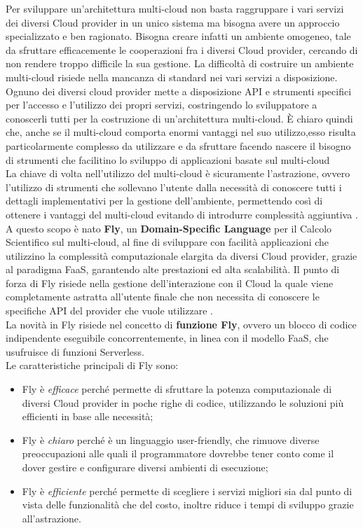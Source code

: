 Per sviluppare un'architettura multi-cloud non basta raggruppare i vari servizi dei diversi Cloud provider in un unico sistema ma bisogna avere un approccio specializzato e ben ragionato. 
Bisogna creare infatti un ambiente omogeneo, tale da sfruttare efficacemente le cooperazioni fra i diversi Cloud provider, cercando di non rendere troppo difficile la sua gestione.
La difficoltà di costruire un ambiente multi-cloud risiede nella mancanza di standard nei vari servizi a disposizione. Ognuno dei diversi cloud provider mette a disposizione API e strumenti specifici per l'accesso e l'utilizzo dei propri servizi, costringendo lo sviluppatore a conoscerli tutti per la costruzione di un'architettura multi-cloud.
È chiaro quindi che, anche se il multi-cloud comporta enormi vantaggi nel suo utilizzo,esso risulta particolarmente complesso da utilizzare e da sfruttare facendo nascere il bisogno di strumenti che facilitino lo sviluppo di applicazioni basate sul multi-cloud\\
La chiave di volta nell’utilizzo del multi-cloud è sicuramente l’astrazione, 
ovvero l'utilizzo di strumenti che sollevano l'utente dalla necessità di conoscere tutti i dettagli implementativi per la gestione dell'ambiente, 
permettendo così di ottenere i vantaggi del multi-cloud evitando di introdurre complessità aggiuntiva \cite{ForbesMultiCloud}. 
A questo scopo è nato \textbf{Fly}, un \textbf{Domain-Specific Language} per il Calcolo Scientifico sul multi-cloud, al fine di sviluppare con facilità applicazioni che utilizzino la complessità computazionale elargita da diversi Cloud provider, grazie al paradigma FaaS, garantendo alte prestazioni ed alta scalabilità. 
Il punto di forza di Fly risiede nella gestione dell'interazione con il Cloud la quale viene completamente astratta all’utente finale che 
non necessita di conoscere le specifiche API del provider che vuole utilizzare \cite{ISISLab}. \\
La novità in Fly risiede nel concetto di \textbf{funzione Fly}, ovvero un blocco di codice indipendente eseguibile concorrentemente, in linea con il modello FaaS, che usufruisce di funzioni Serverless. \\


Le caratteristiche principali di Fly sono:
\begin{itemize}
    \item Fly è \textit{efficace} perché permette di sfruttare la potenza computazionale di diversi Cloud provider in poche righe di codice, utilizzando le soluzioni più efficienti in base alle necessità;

    \item Fly è \textit{chiaro} perché è un linguaggio user-friendly, che rimuove diverse preoccupazioni alle quali il programmatore dovrebbe tener conto
    come il dover gestire e configurare diversi ambienti di esecuzione;
    
    \item Fly è \textit{efficiente} perché permette di scegliere i servizi migliori sia dal punto di vista delle funzionalità che del costo, inoltre riduce i tempi di sviluppo grazie all'astrazione.
\end{itemize}

